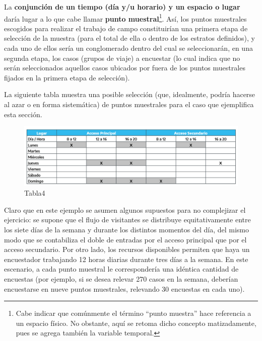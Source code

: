 \documentclass[
]{book}
\begin{document}
La \textbf{conjunción de un tiempo (día y/u horario) y un espacio o lugar} daría lugar a lo que cabe llamar \textbf{punto muestral}\footnote{Cabe indicar que comúnmente el término ``punto muestra'' hace referencia a un espacio físico. No obstante, aquí se retoma dicho concepto matizadamente, pues se agrega también la variable temporal.}. Así, los puntos muestrales escogidos para realizar el trabajo de campo constituirían una primera etapa de selección de la muestra (para el total de ella o dentro de los estratos definidos), y cada uno de ellos sería un conglomerado dentro del cual se seleccionarán, en una segunda etapa, los casos (grupos de viaje) a encuestar (lo cual indica que no serán seleccionados aquellos casos ubicados por fuera de los puntos muestrales fijados en la primera etapa de selección).

La siguiente tabla muestra una posible selección (que, idealmente, podría hacerse al azar o en forma sistemática) de puntos muestrales para el caso que ejemplifica esta sección.

\begin{figure}

{\centering \includegraphics[width=1\linewidth]{imagenes/tabla_4} 

}

\caption{Tabla4}\label{fig:Muestraposible}
\end{figure}

Claro que en este ejemplo se asumen algunos supuestos para no complejizar el ejercicio: se supone que el flujo de visitantes se distribuye equitativamente entre los siete días de la semana y durante los distintos momentos del día, del mismo modo que se contabiliza el doble de entradas por el acceso principal que por el acceso secundario. Por otro lado, los recursos disponibles permiten que haya un encuestador trabajando 12 horas diarias durante tres días a la semana. En este escenario, a cada punto muestral le correspondería una idéntica cantidad de encuestas (por ejemplo, si se desea relevar 270 casos en la semana, deberían encuestarse en nueve puntos muestrales, relevando 30 encuestas en cada uno).
\end{document}
